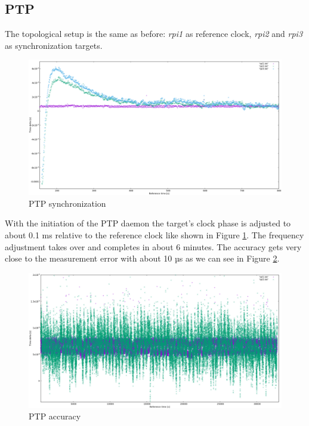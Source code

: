 \subsection{PTP}

The topological setup is the same as before: \textit{rpi1} as reference clock, \textit{rpi2} and \textit{rpi3} as synchronization targets.

\begin{figure}[H]
	\centering
	\includegraphics[width=1.0\textwidth]{figures/plot_ptp1.png}
	\caption{PTP synchronization}
	\label{fig:plot_ptp1}
\end{figure}

With the initiation of the PTP daemon the target's clock phase is adjusted to about 0.1 ms relative to the reference clock like shown in Figure \ref{fig:plot_ptp1}. The frequency adjustment takes over and completes in about 6 minutes. The accuracy gets very close to the measurement error with about 10 µs as we can see in Figure \ref{fig:plot_ptp2}.

\begin{figure}[H]
	\centering
	\includegraphics[width=1.0\textwidth]{figures/plot_ptp2.png}
	\caption{PTP accuracy}
	\label{fig:plot_ptp2}
\end{figure}

